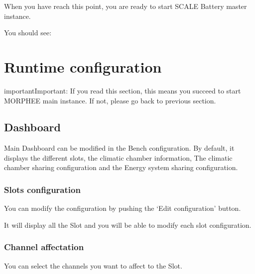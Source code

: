 \documentclass[letterpaper,10pt,english]{jupyterBook}
\begin{document}
\sphinxAtStartPar
When you have reach this point, you are ready to start SCALE Battery master instance.

\sphinxAtStartPar
You should see:


\chapter{Runtime configuration}
\label{\detokenize{05_SCALE_Battery-configuration:runtime-configuration}}\label{\detokenize{05_SCALE_Battery-configuration::doc}}
\begin{sphinxadmonition}{important}{Important:}
\sphinxAtStartPar
If you read this section, this means you succeed to start MORPHEE main instance. If not, please go back to previous section.
\end{sphinxadmonition}


\section{Dashboard}
\label{\detokenize{05_SCALE_Battery-configuration:dashboard}}
\sphinxAtStartPar
Main Dashboard can be modified in the Bench configuration. By default, it displays the different slots, the climatic chamber information, The climatic chamber sharing configuration and the Energy system sharing configuration.

\sphinxAtStartPar
{}


\subsection{Slots configuration}
\label{\detokenize{05_SCALE_Battery-configuration:slots-configuration}}
\sphinxAtStartPar
You can modify the configuration by pushing the ‘Edit configuration’ button.

\sphinxAtStartPar
{}

\sphinxAtStartPar
It will display all the Slot and you will be able to modify each slot configuration.


\subsection{Channel affectation}
\label{\detokenize{05_SCALE_Battery-configuration:channel-affectation}}
\sphinxAtStartPar
You can select the channels you want to affect to the Slot.

\sphinxAtStartPar
{}
\end{document}
